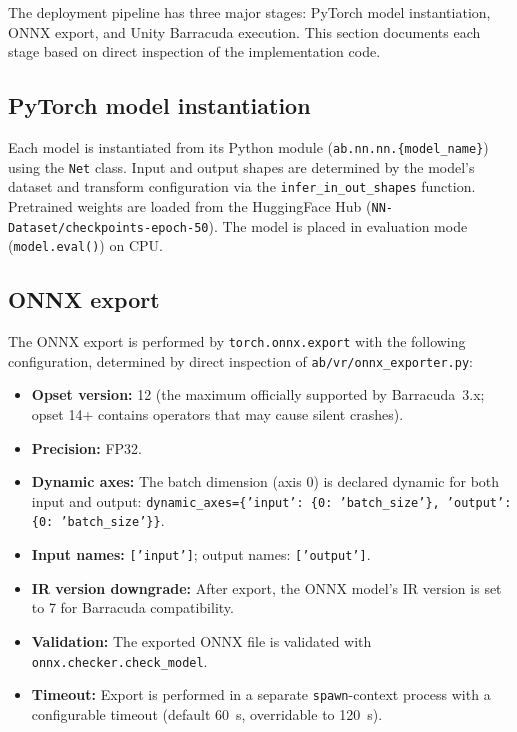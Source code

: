 \documentclass[10pt,twocolumn]{article}
\begin{document}
The deployment pipeline has three major stages: PyTorch model instantiation, ONNX export, and Unity Barracuda execution. This section documents each stage based on direct inspection of the implementation code.

\subsection{PyTorch model instantiation}

Each model is instantiated from its Python module (\texttt{ab.nn.nn.\{model\_name\}}) using the \texttt{Net} class. Input and output shapes are determined by the model's dataset and transform configuration via the \texttt{infer\_in\_out\_shapes} function. Pretrained weights are loaded from the HuggingFace Hub (\texttt{NN-Dataset/checkpoints-epoch-50}). The model is placed in evaluation mode (\texttt{model.eval()}) on CPU.

\subsection{ONNX export}

The ONNX export is performed by \texttt{torch.onnx.export} with the following configuration, determined by direct inspection of \texttt{ab/vr/onnx\_exporter.py}:

\begin{itemize}[nosep,leftmargin=*]
  \item \textbf{Opset version:} 12 (the maximum officially supported by Barracuda~3.x; opset 14+ contains operators that may cause silent crashes).
  \item \textbf{Precision:} FP32.
  \item \textbf{Dynamic axes:} The batch dimension (axis 0) is declared dynamic for both input and output: \texttt{dynamic\_axes=\{'input': \{0: 'batch\_size'\}, 'output': \{0: 'batch\_size'\}\}}.
  \item \textbf{Input names:} \texttt{['input']}; output names: \texttt{['output']}.
  \item \textbf{IR version downgrade:} After export, the ONNX model's IR version is set to 7 for Barracuda compatibility.
  \item \textbf{Validation:} The exported ONNX file is validated with \texttt{onnx.checker.check\_model}.
  \item \textbf{Timeout:} Export is performed in a separate \texttt{spawn}-context process with a configurable timeout (default 60~s, overridable to 120~s).
\end{itemize}
\end{document}
